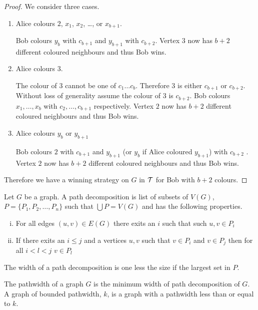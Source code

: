 \begin{proof}
    We consider three cases.
    
    \begin{enumerate}
        \item Alice colours $2$, $x_1$, $x_2$, \ldots, or $x_{b+1}$.
        
        Bob colours $y_{b}$ with $c_{b+1}$ and $y_{b+1}$ with $c_{b+2}$. 
        Vertex $3$ now has $b+2$ different coloured neighbours and thus Bob wins.     
                    
        \item Alice colours $3$.
               
        The colour of $3$ cannot be one of $c_1 \ldots c_{b}$. Therefore $3$ is either $c_{b+1}$ or $c_{b+2}$. 
        Without loss of generality assume the colour of $3$ is $c_{b+2}$.
        Bob colours $x_1, \dots ,x_{b}$ with $c_2,\dots,c_{b+1}$ respectively.
        Vertex $2$ now has $b+2$ different coloured neighbours and thus Bob wins.  
                       
        \item Alice colours $y_{b}$ or $y_{b+1}$
        
        Bob colours $2$ with $c_{b+1}$ and $y_{b+1}$ (or $y_{b}$ if Alice coloured $y_{b+1}$) with $c_{b+2}$ .
        Vertex $2$ now has $b+2$ different coloured neighbours and thus Bob wins. 
    \end{enumerate}

    Therefore we have a winning strategy on $G$ in $\mathcal{T}$ for Bob with $b+2$ colours. 
\end{proof}

\begin{definition}
    Let $G$ be a graph. A path decomposition is list of subsets of $V(G)$, $P=\{P_1,P_2,\dots,P_n\}$ such that $\bigcup P=V(G)$ and has the following properties.    
    \begin{enumerate}[(i)]
        \item For all edges $(u,v) \in E(G)$ there exits an $i$ such that such $u,v\in P_i$
        \item If there exits an $i\leq j$ and a vertices $u,v$ such that $v\in P_i$ and $v\in P_j$ then for all $i<l<j$ $v\in P_l$
    \end{enumerate}
    The width of a path decomposition is one less the size if the largest set in $P$.
\end{definition}

\begin{definition}[Pathwidth]
    The pathwidth of a graph $G$ is the minimum width of path decomposition of $G$.    
    A graph of bounded pathwidth, $k$, is a graph with a pathwidth less than or equal to $k$. 
\end{definition}

